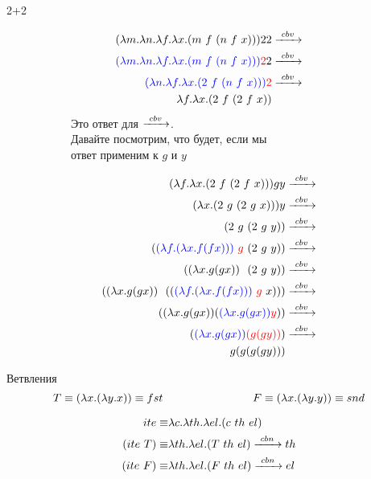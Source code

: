 \begin{frame}{2+2}
  \begin{figure}[t]
    \begin{subfigure}[t]{0.50\textwidth}
  \begin{align*}
  (\lambda m. \lambda n. \lambda f. \lambda x. \app{m\ f\ }{\app{n\ f\ }{x}}){} 2 2 &\cbv \\
  \textcolor{blue}{(\lambda m. \lambda n. \lambda f. \lambda x. \app{m\ f\ }{\app{n\ f\ }{x}}) {}} \textcolor{red}{2} 2 &\cbv \\
  \textcolor{blue}{( \lambda n. \lambda f. \lambda x. \app{2\ f\ }{\app{n\ f\ }{x}}){}} \textcolor{red}{2} & \cbv \\
  \lambda f. \lambda x. \app{2\ f\ }{\app{2\ f\ }{x}}   &
\end{align*}
Это ответ для $\xrightarrow{\ cbv\ }$.\\

Давайте посмотрим, что будет, если мы \\
ответ применим к $g$ и $y$
    \end{subfigure}
    \begin{subfigure}[t]{0.45\textwidth}
  \begin{align*}
  (\lambda f. \lambda x. \app{2\ f\ }{\app{2\ f\ }{x}}) g y  &\cbv \\
  (\lambda x. \app{2\ g\ }{\app{2\ g\ }{x}}) y  &\cbv \\
  \app{2\ g\ }{\app{2\ g\ }{y}}   &\cbv \\
  \app{\tb{\lam{f}{\lam{x}{f (f x)}}} \ \tr{g}\ }{\app{2\ g\ }{y}} &\cbv \\
  \app{\lam{x}{g (g x)} \ \ }{\app{2\ g\ }{y}} &\cbv \\
  \app{\lam{x}{g (g x)} \ \ } {\app{\app{\tb{\lam{f}{\lam{x}{f (f x)}}}\ \tr{g}\ }{x}}} &\cbv \\
  \app{\lam{x}{g (g x)}  } {\app{\tb{\lam{x}{g (g x)} } }{\tr{y}}} &\cbv \\
  \app{\tb{\lam{x}{g (g x)} } } {\tr{(g (g y))}} &\cbv \\
  g (g (g (g y))) &
\end{align*}
    \end{subfigure}
  \end{figure}

\end{frame}

\begin{frame}{Ветвления}
\[
T\equiv(\lambda x . (\lambda y . x)) \equiv fst \qquad \qquad \qquad \qquad
F\equiv (\lambda x . (\lambda y . y))\equiv snd
\]

  \begin{align*}
  ite \equiv & \lambda c. \lambda th. \lambda el. (c\ th\ el) \\
  (ite\ T) \equiv &  \lambda th. \lambda el. (T\ th\ el) \xrightarrow{\ cbn\ } th\\
  (ite\ F) \equiv &  \lambda th. \lambda el. (F\ th\ el) \xrightarrow{\ cbn\ } el
\end{align*}


\end{frame}

